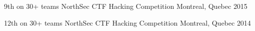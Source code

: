 
\begin{cvhonors}

  \cvhonor
    {9th on 30+ teams} %
    {NorthSec CTF Hacking Competition} %
    {Montreal, Quebec} %
    {2015} %

  \cvhonor
    {12th on 30+ teams} %
    {NorthSec CTF Hacking Competition} %
    {Montreal, Quebec} %
    {2014} %

\end{cvhonors}
